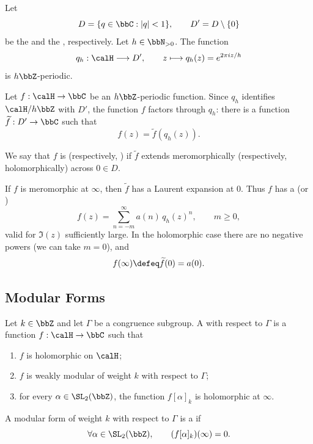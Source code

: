 Let
\[
    D = \{q \in \bbC : |q| < 1\}, \qquad D' = D \setminus \{0\}
\]
be the  and the , respectively. Let $h \in \bbN_{ > 0}$. The function
\[
    q_h : \calH \longrightarrow D', \qquad
    z \longmapsto q_h(z) = e^{2\pi iz/h}
\]
is $h\bbZ$-periodic.

Let $f : \calH \to \bbC$ be an $h\bbZ$-periodic function. Since $q_h$ identifies $\calH/h\bbZ$ with $D'$, the function $f$ factors through $q_h$: there is a function $\widetilde f : D' \to \bbC$ such that
\[
    f(z) = \widetilde f(q_h(z)).
\]

\begin{definition}\label{Def:MF_at_infinity}
    We say that $f$ is  (respectively, )  if $\widetilde f$ extends meromorphically (respectively, holomorphically) across $0 \in D$.
\end{definition}

If $f$ is meromorphic at $\infty$, then $\widetilde f$ has a Laurent expansion at $0$. Thus $f$ has a  (or )
\[
    \boxed{f(z) = \sum_{n = - m}^{\infty}a(n)\,q_h(z)^n, \qquad m \ge 0, }
\]
valid for $\Im(z)$ sufficiently large. In the holomorphic case there are no negative powers (we can take $m = 0$), and
\[
    f(\infty) \defeq \widetilde f(0) = a(0).
\]

\subsection{Modular Forms}\label{Sec:MF_forms}
\begin{definition}\label{Def:MF_modular_form}
    Let $k \in \bbZ$ and let $\Gamma$ be a congruence subgroup. A  with respect to $\Gamma$ is a function $f : \calH \to \bbC$ such that
    \begin{enumerate}[label=(\arabic*)]
        \item $f$ is holomorphic on $\calH$;
        \item $f$ is weakly modular of weight $k$ with respect to $\Gamma$;
        \item for every $\alpha \in \SL_2(\bbZ)$, the function $f[\alpha]_k$ is holomorphic at $\infty$.
    \end{enumerate}
\end{definition}
\begin{definition}\label{Def:MF_cusp_form}
    A modular form of weight $k$ with respect to $\Gamma$ is a  if
    \[
        \forall\alpha \in \SL_2(\bbZ), \qquad (f[\alpha]_k)(\infty) = 0.
    \]
\end{definition}

